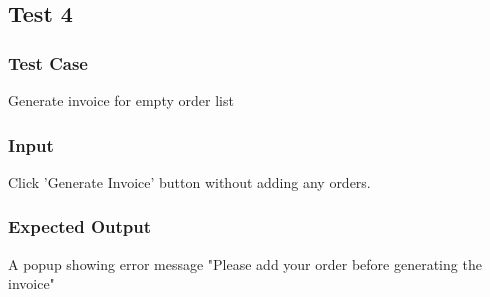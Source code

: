 \documentclass[12pt]{article}
\begin{document}
\subsection{Test 4}
\subsubsection{Test Case}
Generate invoice for empty order list
\subsubsection{Input}
Click 'Generate Invoice' button without adding any orders.
\subsubsection{Expected Output}
A popup showing error message "Please add your order before generating the invoice"
\end{document}
